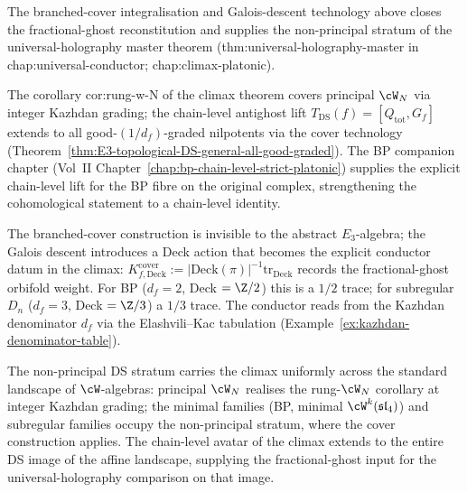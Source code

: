 \begin{remark}%
\label{rem:fractional-ghost-non-principal-input}%
%
%
%
The branched-cover integralisation and Galois-descent technology
above closes the fractional-ghost reconstitution and supplies the
non-principal stratum of the universal-holography master theorem
(\textsf{thm:universal-holography-master} in
\textsf{chap:universal-conductor}; \textsf{chap:climax-platonic}).

The corollary \textsf{cor:rung-w-N} of the climax theorem covers
principal $\cW_N$ via integer Kazhdan grading; the chain-level
antighost lift $T_{\mathrm{DS}}(f) = [Q_{\mathrm{tot}}, G_f]$ extends
to all good-$(1/d_f)$-graded nilpotents via the cover technology
(Theorem~\ref{thm:E3-topological-DS-general-all-good-graded}). The
BP companion chapter
(Vol~II Chapter~\ref{chap:bp-chain-level-strict-platonic}) supplies
the explicit chain-level lift for the BP fibre on the original
complex, strengthening the cohomological statement to a chain-level
identity.

The branched-cover construction is invisible to the abstract
$E_3$-algebra; the Galois descent introduces a Deck action that
becomes the explicit conductor datum in the climax:
$K^{\mathrm{cover}}_{f,\mathrm{Deck}}
 := |\mathrm{Deck}(\pi)|^{-1} \mathrm{tr}_{\mathrm{Deck}}$ records
the fractional-ghost orbifold weight. For BP ($d_f = 2$, Deck $=
\Z/2$) this is a $1/2$ trace; for subregular $D_n$ ($d_f = 3$, Deck
$= \Z/3$) a $1/3$ trace. The conductor reads from the Kazhdan
denominator $d_f$ via the Elashvili--Kac tabulation
(Example~\ref{ex:kazhdan-denominator-table}).

The non-principal DS stratum carries the climax uniformly across the
standard landscape of $\cW$-algebras: principal $\cW_N$ realises the
rung-$\cW_N$ corollary at integer Kazhdan grading; the minimal
families (BP, minimal $\cW^k(\mathfrak{sl}_4)$) and subregular
families occupy the non-principal stratum, where the cover
construction applies. The chain-level avatar of the climax extends
to the entire DS image of the affine landscape, supplying the
fractional-ghost input for the universal-holography comparison on
that image.
\end{remark}

